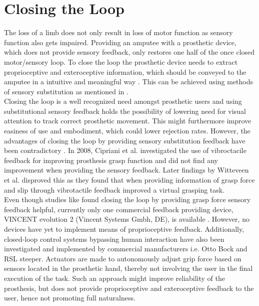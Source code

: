 \section{Closing the Loop}

The loss of a limb does not only result in loss of motor function as sensory function also gets impaired. Providing an amputee with a prosthetic device, which does not provide sensory feedback, only restores one half of the once closed motor/sensory loop. To close the loop the prosthetic device needs to extract proprioceptive and exteroceptive information, which should be conveyed to the amputee in a intuitive and meaningful way \cite{Markovic2018}. This can be achieved using methods of sensory substitution as mentioned in . \\
Closing the loop is a well recognized need amongst prosthetic users and using substitutional sensory feedback holds the possibility of lowering need for visual attention to track correct prosthetic movement. This might furthermore improve easiness of use and embodiment, which could lower rejection rates. \cite{Strbac2016} However, the advantages of closing the loop by providing sensory substitution feedback have been contradictory \cite{Jorgovanovic2014}. In 2008, Cipriani et al. \cite{Cipriani2008} investigated the use of vibroctacile feedback for improving prosthesis grasp function and did not find any improvement when providing the sensory feedback. Later findings by Witteveen et al. \cite{Witteveen2012} disproved this as they found that when providing information of grasp force and slip through vibrotactile feedback improved a virtual grasping task. \\
Even though studies like \cite{Jorgovanovic2014,Witteveen2012} found closing the loop by providing grasp force sensory feedback helpful, currently only one commercial feedback providing device, VINCENT evolution 2 (Vincent Systems Gmbh, DE), is available \cite{Systems2005}. However, no devices have yet to implement means of proprioceptive feedback. Additionally, closed-loop control systems bypassing human interaction have also been investigated and implemented by commercial manufacturers i.e. Otto Bock and RSL steeper. Actuators are made to autonomously adjust grip force based on sensors located in the prosthetic hand, thereby not involving the user in the final execution of the task. \cite{Xu2016} Such an approach might improve reliability of the prosthesis, but does not provide proprioceptive and exteroceptive feedback to the user, hence not promoting full naturalness.  




